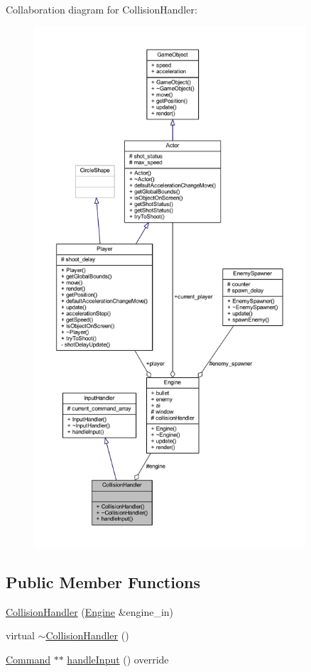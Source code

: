 Collaboration diagram for Collision\+Handler\+:\nopagebreak
\begin{figure}[H]
\begin{center}
\leavevmode
\includegraphics[height=550pt]{class_collision_handler__coll__graph}
\end{center}
\end{figure}
\subsection*{Public Member Functions}
\begin{DoxyCompactItemize}
\item 
\hyperlink{class_collision_handler_a1d575178fc7de4a35e9f0abb1f7f6395}{Collision\+Handler} (\hyperlink{class_engine}{Engine} \&engine\+\_\+in)
\item 
virtual \hyperlink{class_collision_handler_a99f5524cf1706f9ea95500cf273a9d97}{$\sim$\+Collision\+Handler} ()
\item 
\hyperlink{class_command}{Command} $\ast$$\ast$ \hyperlink{class_collision_handler_a7f6deb84dcebcc72e0020eb251ea617f}{handle\+Input} () override
\end{DoxyCompactItemize}
